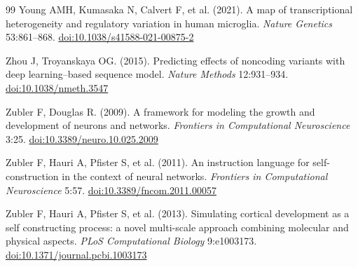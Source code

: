 \begin{thebibliography}{99}
 Young AMH, Kumasaka N, Calvert F, et al. (2021). A map of transcriptional heterogeneity and regulatory variation in human microglia. \textit{Nature Genetics} 53:861–868. \href{https://doi.org/10.1038/s41588-021-00875-2}{doi:10.1038/s41588-021-00875-2}

 Zhou J, Troyanskaya OG. (2015). Predicting effects of noncoding variants with deep learning–based sequence model. \textit{Nature Methods} 12:931–934. \href{https://doi.org/10.1038/nmeth.3547}{doi:10.1038/nmeth.3547}

 Zubler F, Douglas R. (2009). A framework for modeling the growth and development of neurons and networks. \textit{Frontiers in Computational Neuroscience} 3:25. \href{https://doi.org/10.3389/neuro.10.025.2009}{doi:10.3389/neuro.10.025.2009}

 Zubler F, Hauri A, Pfister S, et al. (2011). An instruction language for self-construction in the context of neural networks. \textit{Frontiers in Computational Neuroscience} 5:57. \href{https://doi.org/10.3389/fncom.2011.00057}{doi:10.3389/fncom.2011.00057}

 Zubler F, Hauri A, Pfister S, et al. (2013). Simulating cortical development as a self constructing process: a novel multi-scale approach combining molecular and physical aspects. \textit{PLoS Computational Biology} 9:e1003173. \href{https://doi.org/10.1371/journal.pcbi.1003173}{doi:10.1371/journal.pcbi.1003173}

\end{thebibliography}
